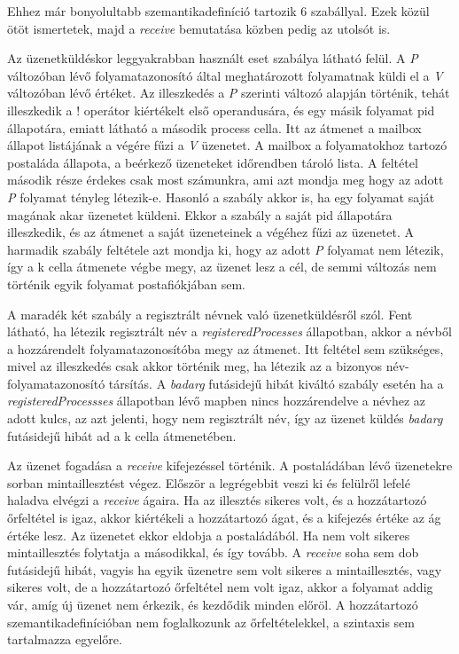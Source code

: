 Ehhez már bonyolultabb szemantikadefiníció tartozik 6 szabállyal. Ezek közül ötöt ismertetek, majd a \textit{receive} bemutatása közben pedig az utolsót is.



Az üzenetküldéskor leggyakrabban használt eset szabálya látható felül. A \textit{P} változóban lévő folyamatazonosító által meghatározott folyamatnak küldi el a \textit{V} változóban lévő értéket. Az illeszkedés a \textit{P} szerinti változó alapján történik, tehát illeszkedik a ! operátor kiértékelt első operandusára, és egy másik folyamat pid állapotára, emiatt látható a második process cella. Itt az átmenet a mailbox állapot listájának a végére fűzi a \textit{V} üzenetet. A mailbox a folyamatokhoz tartozó postaláda állapota, a beérkező üzeneteket időrendben tároló lista. A feltétel második része érdekes csak most számunkra, ami azt mondja meg hogy az adott \textit{P} folyamat tényleg létezik-e. Hasonló a szabály akkor is, ha egy folyamat saját magának akar üzenetet küldeni. Ekkor a szabály a saját pid állapotára illeszkedik, és az átmenet a saját üzeneteinek a végéhez fűzi az üzenetet. A harmadik szabály feltétele azt mondja ki, hogy az adott \textit{P} folyamat nem létezik, így a k cella átmenete végbe megy, az üzenet lesz a cél, de semmi változás nem történik egyik folyamat postafiókjában sem.



A maradék két szabály a regisztrált névnek való üzenetküldésről szól. Fent látható, ha létezik regisztrált név a \textit{registeredProcesses} állapotban, akkor a névből a hozzárendelt folyamatazonosítóba megy az átmenet. Itt feltétel sem szükséges, mivel az illeszkedés csak akkor történik meg, ha létezik az a bizonyos név-folyamatazonosító társítás. A \textit{badarg} futásidejű hibát kiváltó szabály esetén ha a \textit{registeredProcessses} állapotban lévő mapben nincs hozzárendelve a névhez az adott kulcs, az azt jelenti, hogy nem regisztrált név, így az üzenet küldés \textit{badarg} futásidejű hibát ad a k cella átmenetében.

Az üzenet fogadása a \textit{receive} kifejezéssel történik. A postaládában lévő üzenetekre sorban mintaillesztést végez. Először a legrégebbit veszi ki és felülről lefelé haladva elvégzi a \textit{receive} ágaira. Ha az illesztés sikeres volt, és a hozzátartozó őrfeltétel is igaz, akkor kiértékeli a hozzátartozó ágat, és a kifejezés értéke az ág értéke lesz. Az üzenetet ekkor eldobja a postaládából. Ha nem volt sikeres mintaillesztés folytatja a másodikkal, és így tovább. A \textit{receive} soha sem dob futásidejű hibát, vagyis ha egyik üzenetre sem volt sikeres a mintaillesztés, vagy sikeres volt, de a hozzátartozó őrfeltétel nem volt igaz, akkor a folyamat addig vár, amíg új üzenet nem érkezik, és kezdődik minden előröl. A hozzátartozó szemantikadefinícióban nem foglalkozunk az őrfeltételekkel, a szintaxis sem tartalmazza egyelőre.

